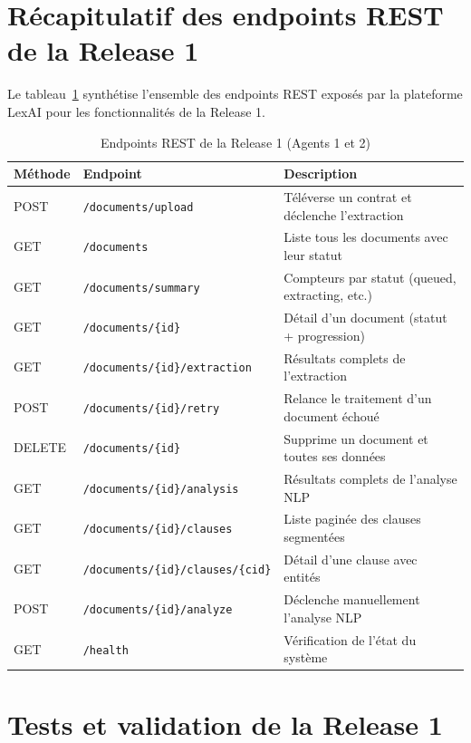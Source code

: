 \section{Récapitulatif des endpoints REST de la Release 1}

Le tableau~\ref{tab:api_r1} synthétise l'ensemble des endpoints REST exposés par la plateforme LexAI pour les fonctionnalités de la Release 1.

\begin{table}[H]
\centering
\small
\renewcommand{\arraystretch}{1.4}
\begin{tabular}{|p{1.5cm}|p{5.5cm}|p{7cm}|}
\hline
\textbf{Méthode} & \textbf{Endpoint} & \textbf{Description} \\
\hline
POST & \texttt{/documents/upload} & Téléverse un contrat et déclenche l'extraction \\
\hline
GET & \texttt{/documents} & Liste tous les documents avec leur statut \\
\hline
GET & \texttt{/documents/summary} & Compteurs par statut (queued, extracting, etc.) \\
\hline
GET & \texttt{/documents/\{id\}} & Détail d'un document (statut + progression) \\
\hline
GET & \texttt{/documents/\{id\}/extraction} & Résultats complets de l'extraction \\
\hline
POST & \texttt{/documents/\{id\}/retry} & Relance le traitement d'un document échoué \\
\hline
DELETE & \texttt{/documents/\{id\}} & Supprime un document et toutes ses données \\
\hline
GET & \texttt{/documents/\{id\}/analysis} & Résultats complets de l'analyse NLP \\
\hline
GET & \texttt{/documents/\{id\}/clauses} & Liste paginée des clauses segmentées \\
\hline
GET & \texttt{/documents/\{id\}/clauses/\{cid\}} & Détail d'une clause avec entités \\
\hline
POST & \texttt{/documents/\{id\}/analyze} & Déclenche manuellement l'analyse NLP \\
\hline
GET & \texttt{/health} & Vérification de l'état du système \\
\hline
\end{tabular}
\caption{Endpoints REST de la Release 1 (Agents 1 et 2)}
\label{tab:api_r1}
\end{table}

\section{Tests et validation de la Release 1}

